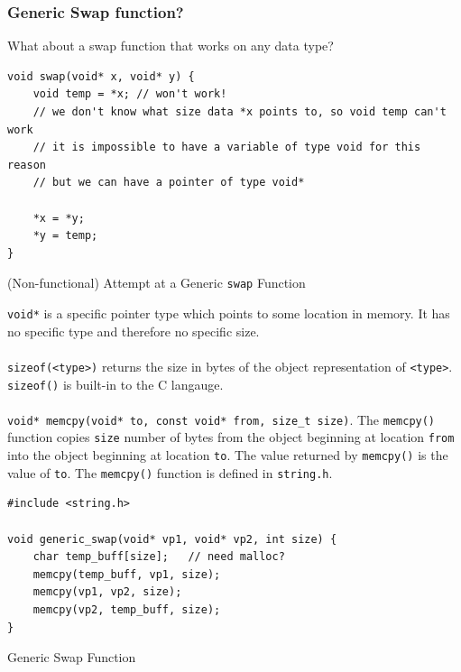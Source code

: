 \documentclass[a4paper,11pt]{article}
\newenvironment{code}{\captionsetup{type=listing}}{}
\begin{document}
\subsubsection{Generic Swap function?}
What about a swap function that works on any data type? 
\begin{code}
\begin{verbatim}
void swap(void* x, void* y) {
    void temp = *x; // won't work!
    // we don't know what size data *x points to, so void temp can't work 
    // it is impossible to have a variable of type void for this reason 
    // but we can have a pointer of type void*

    *x = *y; 
    *y = temp;
}
\end{verbatim}
\caption{(Non-functional) Attempt at a Generic \texttt{swap} Function}
\end{code}
\texttt{void*} is a specific pointer type which points to some location in memory. 
It has no specific type and therefore no specific size.
\\\\
\texttt{sizeof(<type>)} returns the size in bytes of the object representation of \verb|<type>|.
\verb|sizeof()| is built-in to the C langauge.
\\\\
\texttt{void* memcpy(void* to, const void* from, size_t size)}. 
The \verb|memcpy()| function copies \verb|size| number of bytes from the object beginning at location \verb|from| into 
the object beginning at location \verb|to|. 
The value returned by \verb|memcpy()| is the value of \verb|to|. 
The \verb|memcpy()| function is defined in \verb|string.h|.

\begin{code}
\begin{verbatim}
#include <string.h>

void generic_swap(void* vp1, void* vp2, int size) {
    char temp_buff[size];   // need malloc?
    memcpy(temp_buff, vp1, size);
    memcpy(vp1, vp2, size);
    memcpy(vp2, temp_buff, size);
}
\end{verbatim}
\caption{Generic Swap Function}
\end{code}
\end{document}
